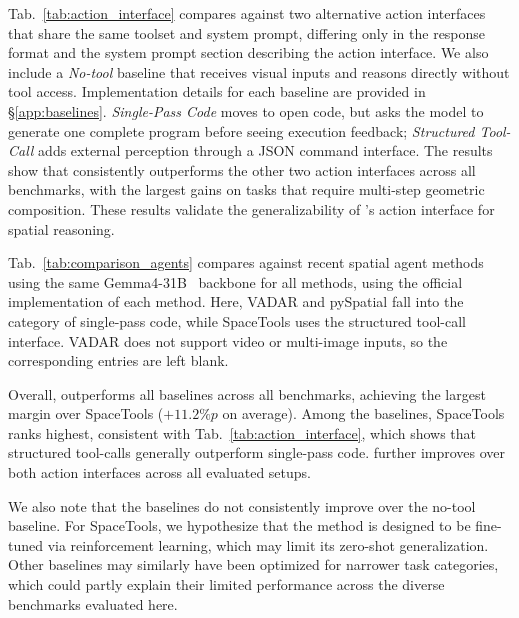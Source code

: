 \label{sec:abl_action}

Tab.~\ref{tab:action_interface} compares \ours{} against two alternative action interfaces that share the same toolset and system prompt, differing only in the response format and the system prompt section describing the action interface. 
We also include a \emph{No-tool} baseline that receives visual inputs and reasons directly without tool access. Implementation details for each baseline are provided in \S\ref{app:baselines}.
\emph{Single-Pass Code} moves to open code, but asks the model to generate one complete program before seeing execution feedback;
\emph{Structured Tool-Call} adds external perception through a JSON command interface. The results show that \ours{} consistently outperforms the other two action interfaces across all benchmarks, with the largest gains on tasks that require multi-step geometric composition. 
These results validate the generalizability of \ours{}'s action interface for spatial reasoning. 




\label{sec:abl_comparison}
Tab.~\ref{tab:comparison_agents} compares \ours{} against recent spatial agent methods~\citep{marsili2025visual,luo2026pyspatial,chen2025spacetools} using the same Gemma4-31B~\citep{gemma4} backbone for all methods, using the official implementation of each method. 
Here, VADAR and pySpatial fall into the category of single-pass code, while SpaceTools uses the structured tool-call interface.
VADAR does not support video or multi-image inputs, so the corresponding entries are left blank.

Overall, \ours{} outperforms all baselines across all benchmarks, achieving the largest margin over SpaceTools ($+11.2\%p$ on average). Among the baselines, SpaceTools ranks highest, consistent with Tab.~\ref{tab:action_interface}, which shows that structured tool-calls generally outperform single-pass code. \ours{} further improves over both action interfaces across all evaluated setups.

We also note that the baselines do not consistently improve over the no-tool baseline. For SpaceTools, we hypothesize that the method is designed to be fine-tuned via reinforcement learning, which may limit its zero-shot generalization. Other baselines may similarly have been optimized for narrower task categories, which could partly explain their limited performance across the diverse benchmarks evaluated here.

